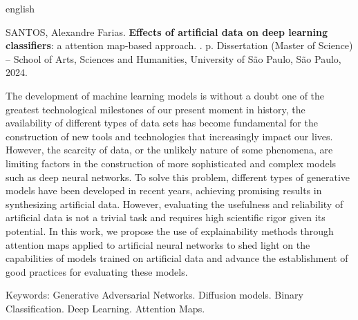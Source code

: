 % 
% 
\begin{resumo}[Abstract]
\begin{otherlanguage*}{english}

% 
%
%
%
\begin{flushleft}
SANTOS, Alexandre Farias. \textbf{Effects of artificial data on deep learning classifiers}: a
attention map-based approach. \imprimirdata. \pageref{LastPage} p. Dissertation (Master of Science) – School of Arts, Sciences and Humanities, University of São Paulo, São Paulo, 2024. 
\end{flushleft}

The development of machine learning models is without a doubt one of the greatest technological milestones of our present moment in history, the availability of different types of data sets has become fundamental for the construction of new tools and technologies that increasingly impact our lives. However, the scarcity of data, or the unlikely nature of some phenomena, are limiting factors in the construction of more sophisticated and complex models such as deep neural networks. To solve this problem, different types of generative models have been developed in recent years, achieving promising results in synthesizing artificial data. However, evaluating the usefulness and reliability of artificial data is not a trivial task and requires high scientific rigor given its potential. In this work, we propose the use of explainability methods through attention maps applied to artificial neural networks to shed light on the capabilities of models trained on artificial data and advance the establishment of good practices for evaluating these models.

Keywords: Generative Adversarial Networks. Diffusion models. Binary Classification. Deep Learning. Attention Maps.
\end{otherlanguage*}
\end{resumo}

